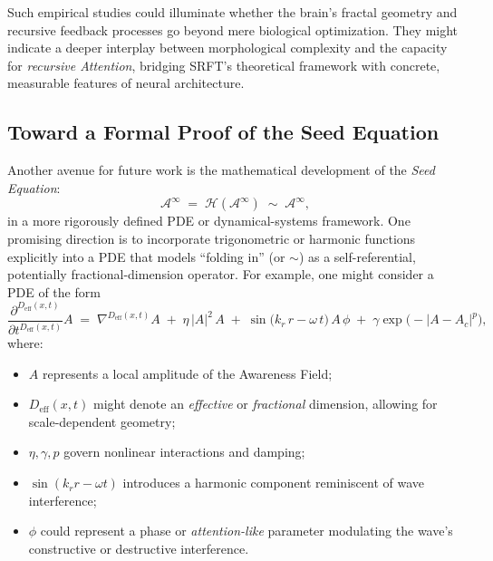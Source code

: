 \documentclass[12pt,a4paper]{article}
\begin{document}
Such empirical studies could illuminate whether the brain’s fractal geometry and recursive feedback processes go beyond mere biological optimization. They might indicate a deeper interplay between morphological complexity and the capacity for \emph{recursive Attention}, bridging SRFT’s theoretical framework with concrete, measurable features of neural architecture.


\subsection{Toward a Formal Proof of the Seed Equation}
\label{subsec:seed-proof}

Another avenue for future work is the mathematical development of the \emph{Seed Equation}:
\[
\mathscr{A}^\infty \;=\; \mathcal{H}(\mathscr{A}^\infty) 
\;\sim\; 
\mathscr{A}^\infty,
\]
in a more rigorously defined PDE or dynamical-systems framework. One promising direction is to incorporate trigonometric or harmonic functions explicitly into a PDE that models “folding in” (or \(\sim\)) as a self-referential, potentially fractional-dimension operator. For example, one might consider a PDE of the form
\[
\frac{\partial^{D_{\text{eff}}(x, t)}}{\partial t^{D_{\text{eff}}(x, t)}} A 
\;=\; 
\nabla^{D_{\text{eff}}(x, t)} A 
\;+\; \eta \,|A|^2 \,A 
\;+\;\sin\bigl(k_r\,r - \omega\,t \bigr) \,A\,\phi 
\;+\;\gamma \exp\bigl(-|A - A_c|^p\bigr),
\]
where:
\begin{itemize}
    \item \(A\) represents a local amplitude of the Awareness Field;
    \item \(D_{\text{eff}}(x, t)\) might denote an \emph{effective} or \emph{fractional} dimension, allowing for scale-dependent geometry;
    \item \(\eta, \gamma, p\) govern nonlinear interactions and damping;
    \item \(\sin(k_r r - \omega t)\) introduces a harmonic component reminiscent of wave interference;
    \item \(\phi\) could represent a phase or \emph{attention-like} parameter modulating the wave’s constructive or destructive interference.
\end{itemize}
\end{document}

